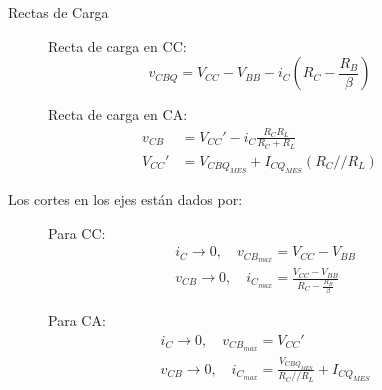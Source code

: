 \begin{frame}[allowframebreaks]{Rectas de Carga}
  \begin{figure}[!h]
    \begin{minipage}[t]{0.45\textwidth}
      Recta de carga en CC:
      \begin{equation*}
        v_{CBQ} = V_{CC} - V_{BB} - i_C \left(R_C - \frac{R_B}{\beta}\right)
      \end{equation*}
    \end{minipage}
    \hfill
    \begin{minipage}[t]{0.45\textwidth}
      Recta de carga en CA:
      \begin{align*}
        v_{CB} &= V_{CC}' - i_C \frac{R_C R_L}{R_C + R_L}\\[6pt]
        V_{CC}' &= V_{CBQ_{MES}} + I_{CQ_{MES}}(R_C // R_L)
      \end{align*}
    \end{minipage}
  \end{figure}
  Los cortes en los ejes están dados por:
  \begin{figure}[!ht]
    \begin{minipage}{0.45\textwidth}
      Para CC:
      \small
      \begin{align*}
        &i_C \to 0, \quad v_{CB_{max}} = V_{CC} - V_{BB}\\[6pt]
        &v_{CB} \to 0, \quad i_{C_{max}} = \frac{V_{CC} - V_{BB}}{R_C - \frac{R_B}{\beta}}
      \end{align*}
    \end{minipage}
    \hfill
    \begin{minipage}{0.45\textwidth}
      Para CA:
      \small
      \begin{align*}
        &i_C \to 0, \quad v_{CB_{max}} = V_{CC}'\\[6pt]
        &v_{CB} \to 0, \quad i_{C_{max}} = \frac{V_{CBQ_{MES}}}{R_C // R_L} + I_{CQ_{MES}}
      \end{align*}
    \end{minipage}
  \end{figure}


\end{frame}

